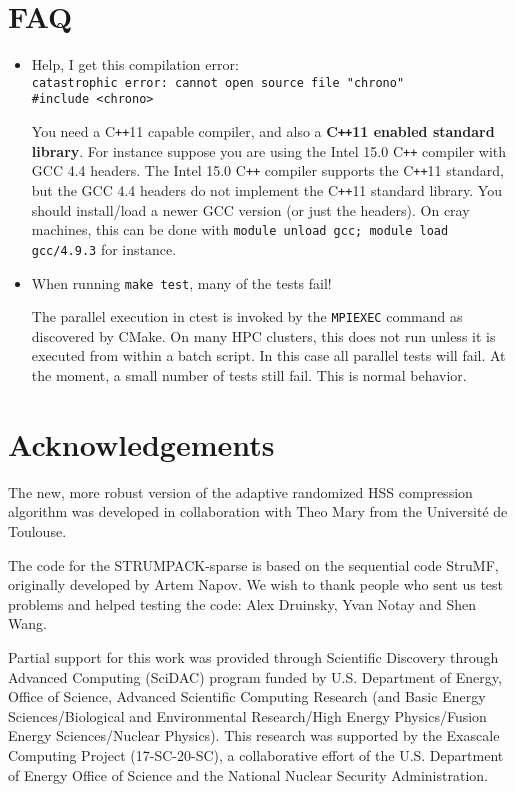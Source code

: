 \documentclass{article}
\begin{document}
\section{FAQ}

\begin{itemize}
\item Help, I get this compilation error:\\
  \verb!catastrophic error: cannot open source file "chrono"! \\
  \verb!#include <chrono>!

  You need a C\texttt{++}11 capable compiler, and also a
  \textbf{C\texttt{++}11 enabled standard library}. For instance
  suppose you are using the Intel 15.0 C\texttt{++} compiler with GCC
  4.4 headers. The Intel 15.0 C\texttt{++} compiler supports the
  C\texttt{++}11 standard, but the GCC 4.4 headers do not implement
  the C\texttt{++}11 standard library. You should install/load a newer
  GCC version (or just the headers). On cray machines, this can be
  done with \lstinline[style=Bash]!module unload gcc; module load gcc/4.9.3!
  for instance.

\item When running \lstinline[style=Bash]!make test!, many of the
  tests fail!

  The parallel execution in ctest is invoked by the
  \lstinline[style=Bash]!MPIEXEC! command as discovered by CMake. On
  many HPC clusters, this does not run unless it is executed from
  within a batch script. In this case all parallel tests will fail. At
  the moment, a small number of tests still fail. This is normal
  behavior.
\end{itemize}


\section{Acknowledgements}
The new, more robust version of the adaptive randomized HSS
compression algorithm was developed in collaboration with Theo Mary
from the Universit\'e de Toulouse.

The code for the STRUMPACK-sparse is based on the sequential code
StruMF, originally developed by Artem Napov. We wish to thank people
who sent us test problems and helped testing the code: Alex Druinsky,
Yvan Notay and Shen Wang.

Partial support for this work was provided through Scientific
Discovery through Advanced Computing (SciDAC) program funded by
U.S. Department of Energy, Office of Science, Advanced Scientific
Computing Research (and Basic Energy Sciences/Biological and
Environmental Research/High Energy Physics/Fusion Energy
Sciences/Nuclear Physics). This research was supported by the Exascale
Computing Project (17-SC-20-SC), a collaborative effort of the
U.S. Department of Energy Office of Science and the National Nuclear
Security Administration.
\end{document}
